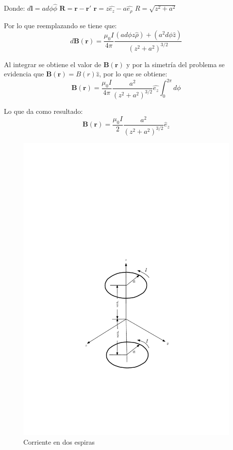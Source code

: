 Donde:
$d\mathbf{l}=a d\phi \hat{\phi}$
$\mathbf{R}=\mathbf{r}-\mathbf{r'}$
$\mathbf{r}=z\hat{e_{z}}-a\hat{e_{\rho}}$
$R=\sqrt{z^{2}+a^{2}}$

Por lo que reemplazando se tiene que:
\begin{equation}
  d\mathbf{B}(\mathbf{r}) = \frac{\mu_{0}I}{4\pi} \frac{(a d\phi z \hat{\rho}) + (a^{2}d\phi \hat{z})}{(z^{2}+a^{2})^{3/2}}
\end{equation}

Al integrar se obtiene el valor de $\mathbf{B}(\mathbf{r})$ y por la simetría del problema se evidencia que $\mathbf{B}(\mathbf{r}) = B(r)\hat{z}$, por lo que se obtiene:
\begin{equation}
  \mathbf{B}(\mathbf{r}) = \frac{\mu_{0}I}{4 \pi} \frac{a^{2}}{(z^{2}+a^{2})^{3/2}} \hat{e_{z}} \int _{0}^{2 \pi} d\phi
\end{equation}

Lo que da como resultado:
\begin{equation}
  \mathbf{B}(\mathbf{r}) = \frac{\mu_{0}I}{2} \frac{a^{2}}{(z^{2}+a^{2})^{3/2}} \hat{e}_{z}
  \label{eq:Campo_magnetico_espira}
\end{equation}

\begin{figure}[H]
  \centering
  \includegraphics[width=0.6\linewidth]{./images/two-loops.pdf}
  \caption{Corriente en dos espiras}
  \label{fig:I_en_dos_espiras}
\end{figure}

